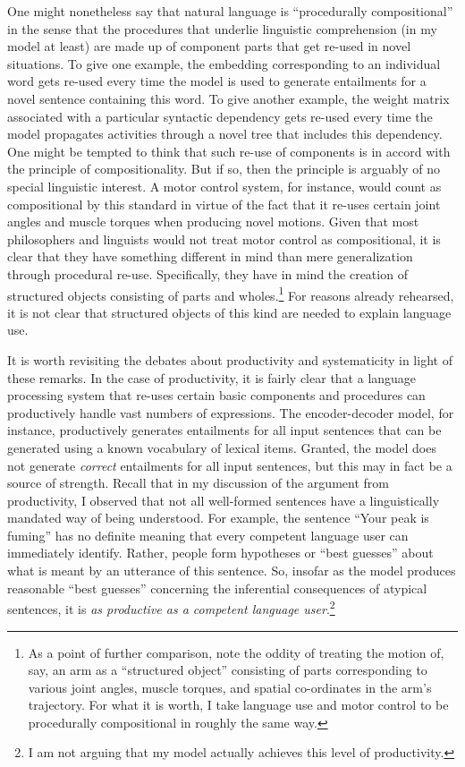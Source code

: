 One might nonetheless say that natural language is ``procedurally compositional'' in the sense that the procedures that underlie linguistic comprehension (in my model at least) are made up of component parts that get re-used in novel situations. To give one example, the embedding corresponding to an individual word gets re-used every time the model is used to generate entailments for a novel sentence containing this word. To give another example, the weight matrix associated with a particular syntactic dependency gets re-used every time the model propagates activities through a novel tree that includes this dependency. One might be tempted to think that such re-use of components is in accord with the principle of compositionality. But if so, then the principle is arguably of no special linguistic interest. A motor control system, for instance, would count as compositional by this standard in virtue of the fact that it re-uses certain joint angles and muscle torques when producing novel motions. Given that most philosophers and linguists would not treat motor control as compositional, it is clear that they have something different in mind than mere generalization through procedural re-use. Specifically, they have in mind the creation of structured objects consisting of parts and wholes.\footnote{As a point of further comparison, note the oddity of treating the motion of, say, an arm as a ``structured object'' consisting of parts corresponding to various joint angles, muscle torques, and spatial co-ordinates in the arm's trajectory. For what it is worth, I take language use and motor control to be procedurally compositional in roughly the same way.} For reasons already rehearsed, it is not clear that structured objects of this kind are needed to explain language use.

It is worth revisiting the debates about productivity and systematicity in light of these remarks. In the case of productivity, it is fairly clear that a language processing system that re-uses certain basic components and procedures can productively handle vast numbers of expressions. The encoder-decoder model, for instance, productively generates entailments for all input sentences that can be generated using a known vocabulary of lexical items. Granted, the model does not generate \textit{correct} entailments for all input sentences, but this may in fact be a source of strength. Recall that in my discussion of the argument from productivity, I observed that not all well-formed sentences have a linguistically mandated way of being understood. For example, the sentence ``Your peak is fuming'' has no definite meaning that every competent language user can immediately identify. Rather, people form hypotheses or ``best guesses'' about what is meant by an utterance of this sentence. So, insofar as the model produces reasonable ``best guesses'' concerning the inferential consequences of atypical sentences, it is \textit{as productive as a competent language user}.\footnote{I am not arguing that my model actually achieves this level of productivity.}

